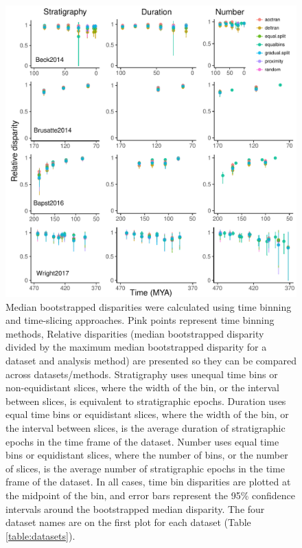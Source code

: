 \documentclass[12pt,a4paper]{article}
\begin{document}
  \begin{figure}[!htbp]
    \centering
    \includegraphics[width=1\linewidth, height=1\textheight, keepaspectratio]{figures/fig-dtt-epoch-appendix.pdf}
    \caption[Relative disparity through time for four example datasets.]
    {Median bootstrapped disparities were calculated using time binning and time-slicing approaches. 
    Pink points represent time binning methods, 
    Relative disparities (median bootstrapped disparity divided by the maximum median bootstrapped disparity for a dataset and analysis method) are presented so they can be compared across datasets/methods. 
    Stratigraphy uses unequal time bins or non-equidistant slices, where the width of the bin, or the interval between slices, is equivalent to stratigraphic epochs. 
    Duration uses equal time bins or equidistant slices, where the width of the bin, or the interval between slices, is the average duration of stratigraphic epochs in the time frame of the dataset. 
    Number uses equal time bins or equidistant slices, where the number of bins, or the number of slices, is the average number of stratigraphic epochs in the time frame of the dataset. 
    In all cases, time bin disparities are plotted at the midpoint of the bin, and error bars represent the 95\% confidence intervals around the bootstrapped median disparity.
    The four dataset names are on the first plot for each dataset (Table \ref{table:datasets}).}
    \label{figure:dtt2}
  \end{figure}  
\end{document}
